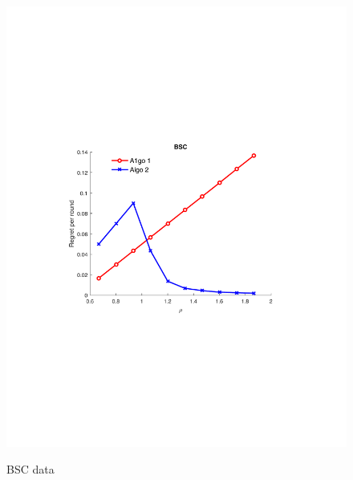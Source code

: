 \begin{figure}[!bt]
\begin{minipage}{4cm}
		\includegraphics[scale=0.3]{../Simulations/Figures/BSC_WD1}
		\label{fig:BSC_WD}
		\vspace{-.5cm}
		\caption{BSC data}
	\end{minipage}
	\begin{minipage}{4cm}
		\centering

\end{minipage}
\end{figure}
